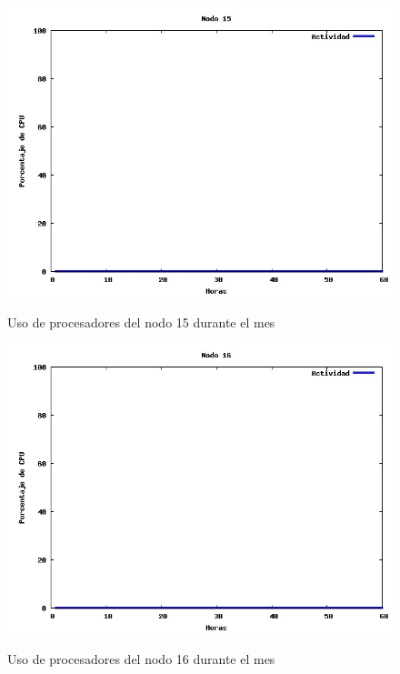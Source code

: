 \documentclass[11pt,a4paper,oneside,openany]{report}
\begin{document}
\begin{figure}[htb]
\centering
\includegraphics[width=0.9\linewidth]{grafico15.jpg}\\
\caption{Uso de procesadores del nodo 15 durante el mes}
\end{figure}

\begin{figure}[htb]
\centering
\includegraphics[width=0.9\linewidth]{grafico16.jpg}\\
\caption{Uso de procesadores del nodo 16 durante el mes}
\end{figure}
\end{document}
